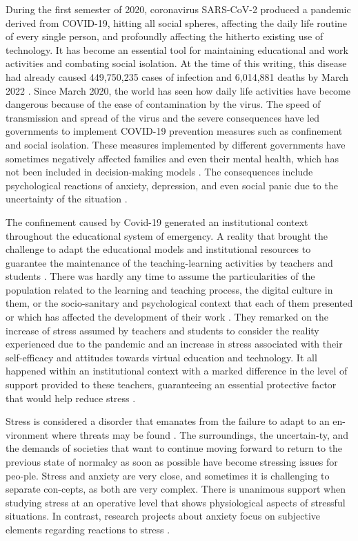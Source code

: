 \documentclass[english]{textolivre}
\begin{document}
During the first semester of 2020, coronavirus SARS-CoV-2 produced a pandemic derived from COVID-19, hitting all social spheres, affecting the daily life routine of every single person, and profoundly affecting the hitherto existing use of technology. It has become an essential tool for maintaining educational and work activities and combating social isolation. At the time of this writing, this disease had already caused 449,750,235 cases of infection and 6,014,881 deaths by March 2022 \cite{johns_hopkins_university_covid-19_nodate}. Since March 2020, the world has seen how daily life activities have become dangerous because of the ease of contamination by the virus. The speed of transmission and spread of the virus and the severe consequences have led governments to implement COVID-19 prevention measures such as confinement and social isolation. These measures implemented by different governments have sometimes negatively affected families and even their mental health, which has not been included in decision-making models \cite[p.~801]{sonugabarke_editorial:_2021}. The consequences include psychological reactions of anxiety, depression, and even social panic due to the uncertainty of the situation \cite{rajkumar_covid-19_2020,yang_mental_2020}.

The confinement caused by Covid-19 generated an institutional context throughout the educational system of emergency. A reality that brought the challenge to adapt the educational models and institutional resources to guarantee the maintenance of the teaching-learning activities by teachers and students \cite{pardo_expandir_2021}. There was hardly any time to assume the particularities of the population related to the learning and teaching process, the digital culture in them, or the socio-sanitary and psychological context that each of them presented or which has affected the development of their work \cite{unesco_covid-19_2020,espino-diaz_analyzing_2020,kosir_predictors_2020}. They remarked on the increase of stress assumed by teachers and students to consider the reality experienced due to the pandemic and an increase in stress associated with their self-efficacy and attitudes towards virtual education and technology. It all happened within an institutional context with a marked difference in the level of support provided to these teachers, guaranteeing an essential protective factor that would help reduce stress \cite{brackett_emotion-regulation_2010}.

Stress is considered a disorder that emanates from the failure to adapt to an en-vironment where threats may be found \cite{selye_stress_1950}. The surroundings, the uncertain-ty, and the demands of societies that want to continue moving forward to return to the previous state of normalcy as soon as possible have become stressing issues for peo-ple. Stress and anxiety are very close, and sometimes it is challenging to separate con-cepts, as both are very complex. There is unanimous support when studying stress at an operative level that shows physiological aspects of stressful situations. In contrast, research projects about anxiety focus on subjective elements regarding reactions to stress \cite{sierra_ansiedad_2003}.
\end{document}
